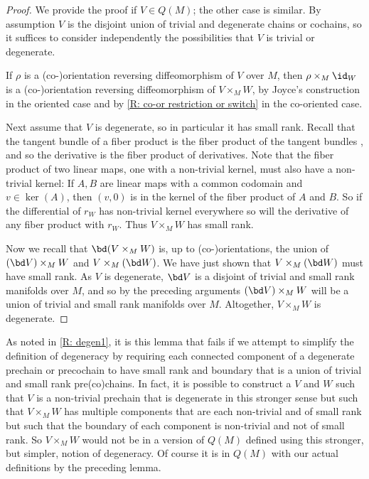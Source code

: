 \begin{proof}
	We provide the proof if $V \in Q(M)$; the other case is similar.
	By assumption $V$ is the disjoint union of trivial and degenerate chains or cochains, so it suffices to consider independently the possibilities that $V$ is trivial or degenerate.

	If $\rho$ is a (co-)orientation reversing diffeomorphism of $V$ over $M$, then $\rho \times_M \id_W$ is a (co-)orientation reversing diffeomorphism of $V \times_M W$, by Joyce's construction in the oriented case and by \cref{R: co-or restriction or switch} in the co-oriented case.

	Next assume that $V$ is degenerate, so in particular it has small rank.
	Recall that the tangent bundle of a fiber product is the fiber product of the tangent bundles \cite[Theorem 5.47]{Wed16}, and so the derivative is the fiber product of derivatives.
	Note that the fiber product of two linear maps, one with a non-trivial kernel, must also have a non-trivial kernel: If $A,B$ are linear maps with a common codomain and $v \in \ker(A)$, then $(v,0)$ is in the kernel of the fiber product of $A$ and $B$.
	So if the differential of $r_W$ has non-trivial kernel everywhere so will the derivative of any fiber product with $r_W$.
	Thus $V \times_M W$ has small rank.

	Now we recall that $\bd(V \times_M W)$ is, up to (co-)orientations, the union of $(\bd V) \times_M W$ and $V \times_M (\bd W)$.
	We have just shown that $V \times_M (\bd W)$ must have small rank.
	As $V$ is degenerate, $\bd V$ is a disjoint of trivial and small rank manifolds over $M$, and so by the preceding arguments $(\bd V) \times_M W$ will be a union of trivial and small rank manifolds over $M$.
	Altogether, $V \times_M W$ is degenerate.
\end{proof}

\begin{remark}\label{R: degen2}
	As noted in \cref{R: degen1}, it is this lemma that fails if we attempt to simplify the definition of degeneracy by requiring each connected component of a degenerate prechain or precochain to have small rank and boundary that is a union of trivial and small rank pre(co)chains.
	In fact, it is possible to construct a $V$ and $W$ such that $V$ is a non-trivial prechain that is degenerate in this stronger sense but such that $V \times_M W$ has multiple components that are each non-trivial and of small rank but such that the boundary of each component is non-trivial and not of small rank.
	So $V \times_M W$ would not be in a version of $Q(M)$ defined using this stronger, but simpler, notion of degeneracy.
	Of course it is in $Q(M)$ with our actual definitions by the preceding lemma.
\end{remark}

